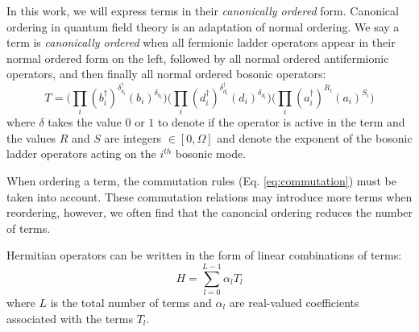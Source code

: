 In this work, we will express terms in their \emph{canonically ordered} form.
Canonical ordering in quantum field theory is an adaptation of normal ordering.
We say a term is \textit{canonically ordered} when all fermionic ladder operators appear in their normal ordered form on the left, followed by all normal ordered antifermionic operators, and then finally all normal ordered bosonic operators:
\begin{equation}
    T = \Big( \prod_i (b_i^\dagger)^{\delta_{b_i}^{\dagger}} (b_i)^{\delta_{b_i}} \Big) \Big( \prod_i (d_i^\dagger)^{\delta_{d_i}^{\dagger}} (d_i)^{\delta_{d_i}} \Big)   \Big( \prod_i (a_i^\dagger)^{R_i}(a_i)^{S_i} \Big) 
\end{equation}
where $\delta$ takes the value $0$ or $1$ to denote if the operator is active in the term and the values $R$ and $S$ are integers $\in [0, \Omega]$ and denote the exponent of the bosonic ladder operators acting on the $i^{th}$ bosonic mode.

When ordering a term, the commutation rules (Eq. \ref{eq:commutation}) must be taken into account.
These commutation relations may introduce more terms when reordering, however, we often find that the canoncial ordering reduces the number of terms.


Hermitian operators can be written in the form of linear combinations of terms:
\begin{equation}
    \label{eq:lclo}
    H = \sum_{l=0}^{L-1} \alpha_l T_l
\end{equation}
where $L$ is the total number of terms and $\alpha_l$ are real-valued  coefficients associated with the terms $T_l$.
